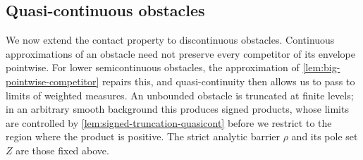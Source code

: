 \subsection{Quasi-continuous obstacles}
\label{sec:big-general-contact}

We now extend the contact property to discontinuous obstacles. Continuous approximations of an obstacle need not preserve every competitor of its envelope pointwise. For lower semicontinuous obstacles, the approximation of \cref{lem:big-pointwise-competitor} repairs this, and quasi-continuity then allows us to pass to limits of weighted measures. An unbounded obstacle is truncated at finite levels; in an arbitrary smooth background this produces signed products, whose limits are controlled by \cref{lem:signed-truncation-quasicont} before we restrict to the region where the product is positive. The strict analytic barrier $\rho$ and its pole set $Z$ are those fixed above.

